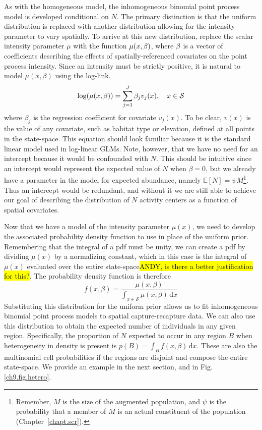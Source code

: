 As with the homogeneous model, the inhomogeneous binomial point process
model is developed conditional on $N$. The primary distinction is that
the uniform distribution is replaced with another distribution
allowing for the intensity parameter to vary spatially. To arrive at
this new distribution, replace the scalar intensity parameter $\mu$
with the function $\mu(x, {\bold \beta})$, where $\bold \beta$ is a
vector of coefficients describing the effects of
spatially-referenced covariates on the point process intensity.
Since an intensity must be strictly
positive, it is natural to model $\mu(x, \beta)$ using the log-link.
\[
\log(\mu(x, \beta)) = \sum_{j=1}^J \beta_j v_j(x), \quad  x \in \cal{S}
\]
where $\beta_j$ is the regression coefficient for covariate
$v_j(x)$. To be clear, $v(x)$ is the value of any covariate, such as
habitat type or elevation, defined at all points in  the state-space.
This equation should look
familiar because it is the standard linear model used in log-linear
GLMs. Note, however, that we have no need
for an intercept because it would be confounded with
$N$. This should be intuitive since an intercept would
represent the expected value of $N$ when $\beta=0$, but we already
have a parameter in the model for expected abundance, namely $\mathbb{E}[N] =
\psi M$\footnote{Remember, $M$ is the size of the augmented population, and
$\psi$ is the probability that a member of $M$ is an actual
constituent of the population (Chapter~\ref{chapt.scr}).}. Thus an intercept would be
redundant, and without it we are still able to achieve our goal of
describing the distribution of $N$ activity centers as a function of
spatial covariates.

Now that we have a model of the intensity parameter $\mu(x)$,
we need to develop the associated probability density function to use
in place of the uniform prior. Remembering that
the integral of a pdf must be unity, we can create a pdf by dividing
$\mu(x)$ by a normalizing constant, which in this case is the integral
of $\mu(x)$ evaluated over the entire
state-space\hl{ANDY, is there a better justification for this?}. The
probability density function is therefore
\begin{equation}
f(x, \beta) = \frac{\mu(x, \beta)}{\int_{x \in \mathcal{S}} \mu(x, \beta)\, \mathrm{d}x}
\label{eq.pdf.ipp}
\end{equation}
Substituting this distribution for the
uniform prior allows us to fit inhomogeneous binomial point process
models to spatial capture-recapture data. We can also use this
distribution to obtain the expected number of individuals in any given
region. Specifically, the proportion of $N$ expected to occur in any
region $B$ when heterogeneity in density is present is $p(B) = \int_B
f(x, \beta)\, \mathrm{d}x$. These are
also the multinomial cell probabilities if the regions are
disjoint and compose the entire state-space. We provide an example in
the next section, and in Fig.\ref{ch9.fig.hetero}.

